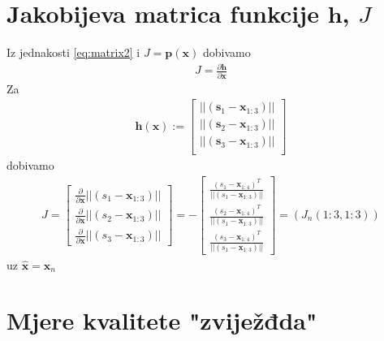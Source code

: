 \documentclass[a4paper,twoside,12pt]{memoir} %
\begin{document}
\chapter{Jakobijeva matrica funkcije $\mathbf{h}$, $J$}
Iz jednakosti \ref{eq:matrix2} i $J = \mathbf{p}(\mathbf{x})$ dobivamo
\begin{align}
J = \frac{\partial \mathbf{h}}{\partial \mathbf{x}}
\end{align}
Za 
\begin{align}
\mathbf{h} (\mathbf{x}) := 
\begin{bmatrix}
||(\mathbf{s}_1-\mathbf{x}_{1:3})|| \\
||(\mathbf{s}_2-\mathbf{x}_{1:3})|| \\
||(\mathbf{s}_3-\mathbf{x}_{1:3})||\\
\end{bmatrix} 
\end{align}
dobivamo
\begin{align}
J = \begin{bmatrix}
\frac{\partial}{\partial \mathbf{x}} ||(s_1-\mathbf{x}_{1:3})|| \\
\frac{\partial}{\partial \mathbf{x}} ||(s_2-\mathbf{x}_{1:3})||\\
\frac{\partial}{\partial \mathbf{x}} ||(s_3-\mathbf{x}_{1:3})|| 
\end{bmatrix}%
= - \begin{bmatrix}
\frac{(s_1-\mathbf{x}_{1:4})^T}{||(s_1-\mathbf{x}_{1:3})||} \\
\frac{(s_2-\mathbf{x}_{1:4})^T}{||(s_1-\mathbf{x}_{1:3})||}\\
\frac{(s_3-\mathbf{x}_{1:4})^T}{||(s_1-\mathbf{x}_{1:3})||} 
\end{bmatrix} = (J_n(1:3,1:3))
\end{align}
uz $\hat{\mathbf{x}} = \mathbf{x}_n$
\chapter{Mjere kvalitete "zviježđda"}\label{appendix:DOP}
\end{document}
